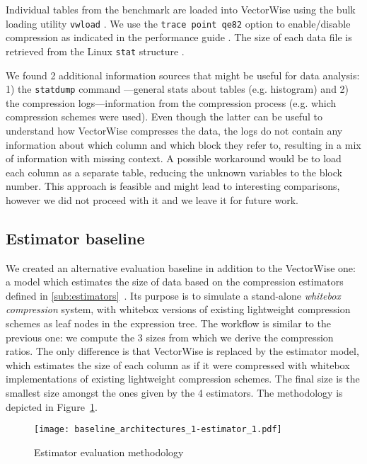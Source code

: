 Individual tables from the benchmark are loaded into VectorWise using the bulk loading utility \verb|vwload| \cite{vwvwload}. We use the \verb|trace point qe82| option to enable/disable compression as indicated in the performance guide \cite{vwperfguide}. The size of each data file is retrieved from the Linux \verb|stat| structure \cite{linuxstructstat}.

We found 2 additional information sources that might be useful for data analysis: 1) the \verb|statdump| command \cite{vwstatdump}---general stats about tables (e.g. histogram) and 2) the compression logs---information from the compression process (e.g. which compression schemes were used). Even though the latter can be useful to understand how VectorWise compresses the data, the logs do not contain any information about which column and which block they refer to, resulting in a mix of information with missing context.  A possible workaround would be to load each column as a separate table, reducing the unknown variables to the block number. This approach is feasible and might lead to interesting comparisons, however we did not proceed with it and we leave it for future work.



\subsection{Estimator baseline}
\label{subsec:eval:methodology:estimator}

We created an alternative evaluation baseline in addition to the VectorWise one: a model which estimates the size of data based on the compression estimators defined in \ref{sub:estimators}~. Its purpose is to simulate a stand-alone \textit{whitebox compression} system, with whitebox versions of existing lightweight compression schemes as leaf nodes in the expression tree. The workflow is similar to the previous one: we compute the 3 sizes from which we derive the compression ratios. The only difference is that VectorWise is replaced by the estimator model, which estimates the size of each column as if it were compressed with whitebox implementations of existing lightweight compression schemes. The final size is the smallest size amongst the ones given by the 4 estimators. The methodology is depicted in Figure~\ref{fig:eval:methodology:estimatorbaseline}.

\begin{figure}[h]
  \centering
  \texttt{[image: baseline\_architectures\_1-estimator\_1.pdf]}
  \caption{Estimator evaluation methodology}
  \label{fig:eval:methodology:estimatorbaseline}
\end{figure}

